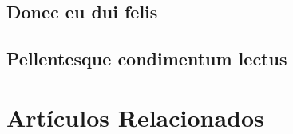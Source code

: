 \subsection{Donec eu dui felis}

\subsection{Pellentesque condimentum lectus}


\section{Artículos Relacionados}





















